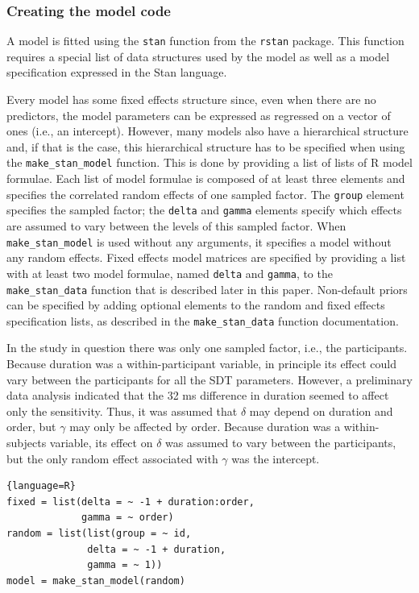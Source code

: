 \documentclass[a4paper,man,apacite,floatsintext]{apa6}
\newcommand{\code}[1]{\texttt{#1}}
\begin{document}
\subsubsection{Creating the model code}

A model is fitted using the \code{stan} function from the \code{rstan}
package. This function requires a special list of data structures used
by the model as well as a model specification expressed in the Stan
language.

Every model has some fixed effects structure since, even when there
are no predictors, the model parameters can be expressed as regressed
on a vector of ones (i.e., an intercept). However, many models also
have a hierarchical structure and, if that is the case, this
hierarchical structure has to be specified when using the
\code{make\_stan\_model} function. This is done by providing a list of
lists of R model formulae. Each list of model formulae is composed of
at least three elements and specifies the correlated random effects of
one sampled factor. The \code{group} element specifies the sampled
factor; the \code{delta} and \code{gamma} elements specify which
effects are assumed to vary between the levels of this sampled
factor. When \code{make\_stan\_model} is used without any arguments,
it specifies a model without any random effects. Fixed effects model
matrices are specified by providing a list with at least two model
formulae, named \code{delta} and \code{gamma}, to the
\code{make\_stan\_data} function that is described later in this
paper. Non-default priors can be specified by adding optional elements
to the random and fixed effects specification lists, as described in
the \code{make\_stan\_data} function documentation.

In the study in question there was only one sampled factor, i.e., the
participants. Because duration was a within-participant variable, in
principle its effect could vary between the participants for all the
SDT parameters. However, a preliminary data analysis indicated that
the 32 ms difference in duration seemed to affect only the
sensitivity. Thus, it was assumed that $\delta$ may depend on duration
and order, but $\gamma$ may only be affected by order. Because
duration was a within-subjects variable, its effect on $\delta$ was
assumed to vary between the participants, but the only random effect
associated with $\gamma$ was the intercept.

\begin{lstlisting}{language=R}
fixed = list(delta = ~ -1 + duration:order, 
             gamma = ~ order)
random = list(list(group = ~ id, 
              delta = ~ -1 + duration, 
              gamma = ~ 1))
model = make_stan_model(random)
\end{lstlisting}
\end{document}
